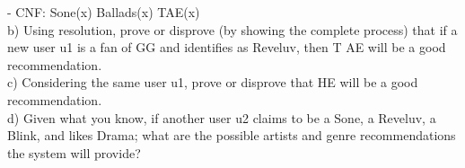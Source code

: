 \documentclass{article}
\begin{document}
\: \: \: \: - CNF: \neg Sone(x) \vee \neg Ballads(x) \vee TAE(x)\\

b) Using resolution, prove or disprove (by showing the complete process) that if a new user u1 is a fan of GG and identifies as Reveluv, then T AE will be a good recommendation.\\


c) Considering the same user u1, prove or disprove that HE will be a good recommendation.\\


d) Given what you know, if another user u2 claims to be a Sone, a Reveluv, a Blink, and likes Drama;
what are the possible artists and genre recommendations the system will provide? \\
\end{document}
